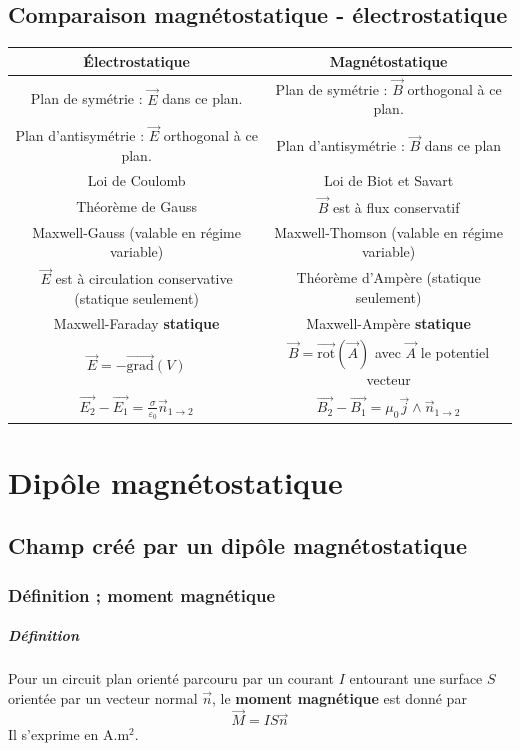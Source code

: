 \documentclass[french]{book}
\theoremstyle{plain}
\theoremstyle{definition}
\theoremstyle{remark}
\newcommand{\grad}{\overrightarrow{\text{grad}}}
\newcommand{\rot}{\overrightarrow{\text{rot}}}
\begin{document}
\section{Comparaison magnétostatique - électrostatique}
\begin{center}
	\begin{tabular}{|c|c|}
		\hline
		Électrostatique&Magnétostatique \\
		\hline
		Plan de symétrie : $\overrightarrow{E}$ dans ce plan.&Plan de symétrie : $\overrightarrow{B}$ orthogonal à ce plan. \\
		\hline 
		Plan d'antisymétrie : $\overrightarrow{E}$ orthogonal à ce plan.& Plan d'antisymétrie : $\overrightarrow{B}$ dans ce plan \\
		\hline 
		Loi de Coulomb&Loi de Biot et Savart \\
		\hline
		Théorème de Gauss&$\overrightarrow{B}$ est à flux conservatif\\
		\hline
		Maxwell-Gauss (valable en régime variable)&Maxwell-Thomson (valable en régime variable) \\
		\hline
		$\overrightarrow{E}$ est à circulation conservative (statique seulement)&Théorème d'Ampère (statique seulement)\\
		\hline
		Maxwell-Faraday \textbf{statique}& Maxwell-Ampère \textbf{statique} \\
		\hline
		$\overrightarrow{E}=-\grad(V)$&$\overrightarrow{B}=\rot(\overrightarrow{A})$ avec $\overrightarrow{A}$ le potentiel vecteur \\
		\hline
		$\overrightarrow{E_2}-\overrightarrow{E_1}=\frac{\sigma}{\varepsilon_0}\overrightarrow{n}_{1\to 2}$&$\overrightarrow{B_2}-\overrightarrow{B_1}=\mu_0 \overrightarrow{j}\wedge\overrightarrow{n}_{1\to 2}$ \\
		\hline
	\end{tabular}
\end{center}
\chapter{Dipôle magnétostatique}
\localtableofcontents
\section{Champ créé par un dipôle magnétostatique}
\subsection{Définition ; moment magnétique}
\paragraph{Définition} Pour un circuit plan orienté parcouru par un courant $I$ entourant une surface $S$ orientée par un vecteur normal $\overrightarrow{n}$, le \textbf{moment magnétique} est donné par $$\overrightarrow{M}=IS\overrightarrow{n}$$ Il s'exprime en A.m$^2$.
\end{document}
